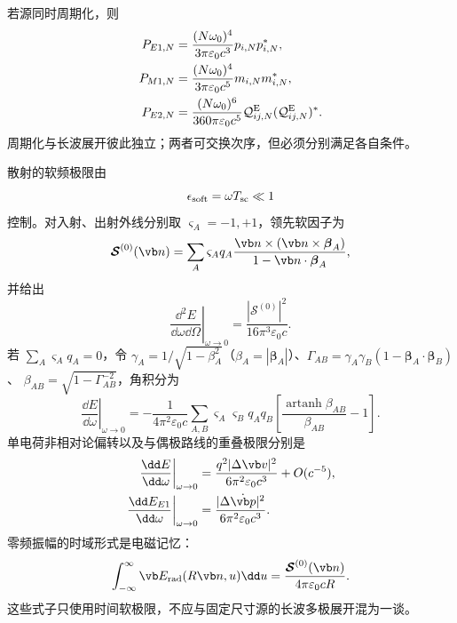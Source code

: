 若源同时周期化，则
\begin{align}
 P_{E1,N}&=\frac{(N\omega_0)^4}{3\pi\varepsilon_0c^3}p_{i,N}p_{i,N}^*,\\
 P_{M1,N}&=\frac{(N\omega_0)^4}{3\pi\varepsilon_0c^5}m_{i,N}m_{i,N}^*,\\
 P_{E2,N}&=\frac{(N\omega_0)^6}{360\pi\varepsilon_0c^5}
 \mathcal Q^{\rm E}_{ij,N}(\mathcal Q^{\rm E}_{ij,N})^* .
 \label{eq:phys-rr-periodic-multipole-lines}
\end{align}
周期化与长波展开彼此独立；两者可交换次序，但必须分别满足各自条件。

散射的软频极限由
\begin{equation}
 \epsilon_{\rm soft}=\omega T_{\rm sc}\ll1
 \label{eq:phys-rr-soft-control}
\end{equation}
控制。对入射、出射外线分别取 \(\varsigma_A=-1,+1\)，领先软因子为
\begin{equation}
 \boldsymbol{\mathcal S}^{(0)}(\vb n)
 =\sum_A\varsigma_Aq_A
 \frac{\vb n\times(\vb n\times\boldsymbol\beta_A)}
 {1-\vb n\cdot\boldsymbol\beta_A},
 \label{eq:phys-rr-leading-soft-factor}
\end{equation}
并给出
\begin{equation}
 \left.\frac{\dd^2E}{\dd\omega\dd\Omega}\right|_{\omega\to0}
 =\frac{|\boldsymbol{\mathcal S}^{(0)}|^2}
 {16\pi^3\varepsilon_0c}.
 \label{eq:phys-rr-soft-angular-spectrum}
\end{equation}
若 \(\sum_A\varsigma_Aq_A=0\)，令
\(\gamma_A=1/\sqrt{1-\beta_A^2}\)（\(\beta_A=|\boldsymbol\beta_A|\)）、\(\Gamma_{AB}=\gamma_A\gamma_B(1-\boldsymbol\beta_A\cdot\boldsymbol\beta_B)\)、
\(\beta_{AB}=\sqrt{1-\Gamma_{AB}^{-2}}\)，角积分为
\begin{equation}
 \left.\frac{\dd E}{\dd\omega}\right|_{\omega\to0}
 =-\frac1{4\pi^2\varepsilon_0c}
 \sum_{A,B}\varsigma_A\varsigma_Bq_Aq_B
 \left[\frac{\operatorname{artanh}\beta_{AB}}{\beta_{AB}}-1\right].
 \label{eq:phys-rr-soft-integrated-spectrum}
\end{equation}
单电荷非相对论偏转以及与偶极路线的重叠极限分别是
\begin{align}
 \left.\frac{\dd E}{\dd\omega}\right|_{\omega\to0}
 &=\frac{q^2|\Delta\vb v|^2}{6\pi^2\varepsilon_0c^3}+O(c^{-5}),
 \label{eq:phys-rr-soft-nonrel-limit}\\
 \left.\frac{\dd E_{E1}}{\dd\omega}\right|_{\omega\to0}
 &=\frac{|\Delta\dot{\vb p}|^2}{6\pi^2\varepsilon_0c^3}.
 \label{eq:phys-rr-e1-soft-limit}
\end{align}
零频振幅的时域形式是电磁记忆：
\begin{equation}
 \int_{-\infty}^{\infty}\vb E_{\rm rad}(R\vb n,u)\dd u
 =\frac{\boldsymbol{\mathcal S}^{(0)}(\vb n)}
 {4\pi\varepsilon_0cR}.
 \label{eq:phys-rr-em-memory-soft-relation}
\end{equation}
这些式子只使用时间软极限，不应与固定尺寸源的长波多极展开混为一谈。

